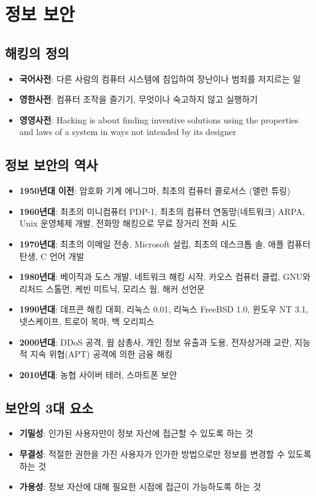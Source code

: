 \section{정보 보안}
\subsection{해킹의 정의}
\begin{itemize}
	\item \textbf{국어사전}: 다른 사람의 컴퓨터 시스템에 침입하여 장난이나 범죄를 저지르는 일
	\item \textbf{영한사전}: 컴퓨터 조작을 즐기기, 무엇이나 숙고하지 않고 실행하기
	\item \textbf{영영사전}: Hacking is about finding inventive solutions using the properties and laws of a system in ways not intended by its designer
\end{itemize}

\subsection{정보 보안의 역사}
\begin{itemize}
	\item \textbf{1950년대 이전}: 암호화 기계 에니그마, 최초의 컴퓨터 콜로서스 (앨런 튜링)
	\item \textbf{1960년대}: 최초의 미니컴퓨터 PDP-1, 최초의 컴퓨터 연동망(네트워크) ARPA, Unix 운영체제 개발, 전화망 해킹으로 무료 장거리 전화 시도
	\item \textbf{1970년대}: 최초의 이메일 전송, Microsoft 설립, 최초의 데스크톱 솔, 애플 컴퓨터 탄생, C 언어 개발
	\item \textbf{1980년대}: 베이직과 도스 개발, 네트워크 해킹 시작, 카오스 컴퓨터 클럽, GNU와 리처드 스톨먼, 케빈 미트닉, 모리스 웜, 해커 선언문
	\item \textbf{1990년대}: 데프콘 해킹 대회, 리눅스 0.01, 리눅스 FreeBSD 1.0, 윈도우 NT 3.1, 넷스케이프, 트로이 목마, 백 오리피스
	\item \textbf{2000년대}: DDoS 공격, 웜 삼총사, 개인 정보 유출과 도용, 전자상거래 교란, 지능적 지속 위협(APT) 공격에 의한 금융 해킹
	\item \textbf{2010년대}: 농협 사이버 테러, 스마트폰 보안
\end{itemize}

\subsection{보안의 3대 요소}
\begin{itemize}
	\item \textbf{기밀성}: 인가된 사용자만이 정보 자산에 접근할 수 있도록 하는 것
	\item \textbf{무결성}: 적절한 권한을 가진 사용자가 인가한 방법으로만 정보를 변경할 수 있도록 하는 것
	\item \textbf{가용성}: 정보 자산에 대해 필요한 시점에 접근이 가능하도록 하는 것
\end{itemize}


